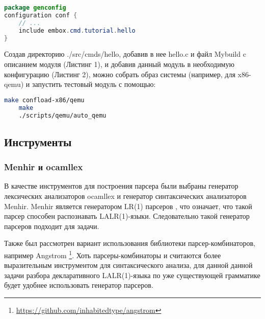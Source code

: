 \begin{lstlisting}[caption=Пример описания конфигурации, language=Java, frame=single, breaklines]
package genconfig
configuration conf {
    // ...
    include embox.cmd.tutorial.hello
}
\end{lstlisting}

Создав директорию ./src/cmds/hello, добавив в нее hello.c и файл Mybuild c описанием модуля (Листинг 1), и добавив данный модуль в необходимую конфигурацию (Листинг 2), можно собрать образ системы (например, для x86-qemu) и запустить тестовый модуль с помощью:
\begin{lstlisting}[caption=Запуск тестового модуля, language=bash, frame=single, breaklines]
    make confload-x86/qemu
    make
    ./scripts/qemu/auto_qemu
\end{lstlisting}
\subsection{Инструменты}
\subsubsection[short]{Menhir и ocamllex}
В качестве инструментов для построения парсера были выбраны генератор лексических анализаторов ocamllex и генератор синтаксических анализаторов Menhir. Menhir является генератором LR(1) парсеров \cite{2021MenhirRM}, что означает, что такой парсер способен распознавать LALR(1)-языки. Следовательно такой генератор парсеров подходит для задачи.

Также был рассмотрен вариант использования библиотеки парсер-комбинаторов, например Angstrom \footnote{\href{https://github.com/inhabitedtype/angstrom}{https://github.com/inhabitedtype/angstrom}}. Хоть парсеры-комбинаторы и считаются более выразительным инструментом для синтаксического анализа, для данной данной задачи разбора декларативного LALR(1)-язы\-ка по уже существующей грамматике будет удобнее использовать генератор парсеров.





